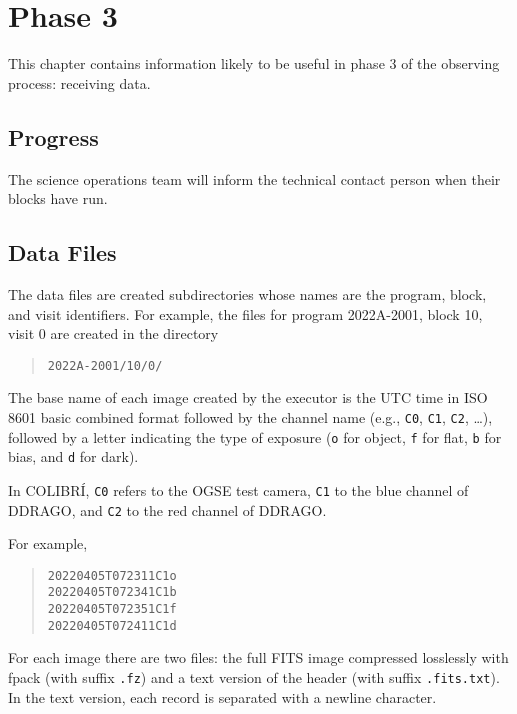\chapter{Phase 3}
\label{chapter:phase-3}

This chapter contains information likely to be useful in phase 3 of the observing process: receiving data.

\section{Progress}

The science operations team will inform the technical contact person when their blocks have run.

\section{Data Files}

The data files are created subdirectories whose names are the program, block, and visit identifiers. For example, the files for program 2022A-2001, block 10, visit 0 are created in the directory

\begin{quote}
\verb|2022A-2001/10/0/|
\end{quote}

The base name of each image created by the executor is the UTC time in ISO 8601 basic combined format followed by the channel name (e.g., \verb|C0|, \verb|C1|, \verb|C2|, \ldots), followed by a letter indicating the type of exposure (\verb|o| for object, \verb|f| for flat, \verb|b| for bias, and \verb|d| for dark). 

In COLIBRÍ, \verb|C0| refers to the OGSE test camera, \verb|C1| to the blue channel of DDRAGO, and \verb|C2| to the red channel of DDRAGO.

For example,

\begin{quote}
\verb|20220405T072311C1o|\\
\verb|20220405T072341C1b|\\
\verb|20220405T072351C1f|\\
\verb|20220405T072411C1d|
\end{quote}

For each image there are two files: the full FITS image compressed losslessly with fpack (with suffix \verb|.fz|) and a text version of the header (with suffix \verb|.fits.txt|). In the text version, each record is separated with a newline character.

